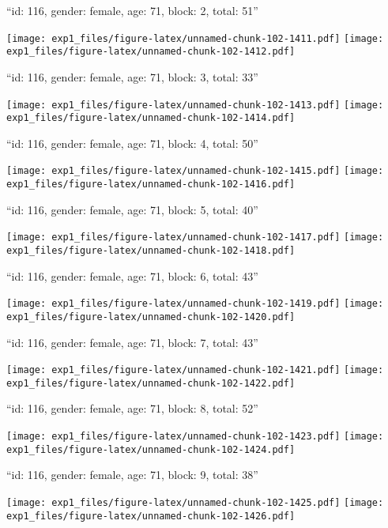 \documentclass[11pt,,]{article}
\begin{document}
\newpage
[1] 

``id: 116, gender: female, age: 71, block: 2, total: 51''

\texttt{[image: exp1\_files/figure-latex/unnamed-chunk-102-1411.pdf]}
\texttt{[image: exp1\_files/figure-latex/unnamed-chunk-102-1412.pdf]}

\newpage
[1] 

``id: 116, gender: female, age: 71, block: 3, total: 33''

\texttt{[image: exp1\_files/figure-latex/unnamed-chunk-102-1413.pdf]}
\texttt{[image: exp1\_files/figure-latex/unnamed-chunk-102-1414.pdf]}

\newpage
[1] 

``id: 116, gender: female, age: 71, block: 4, total: 50''

\texttt{[image: exp1\_files/figure-latex/unnamed-chunk-102-1415.pdf]}
\texttt{[image: exp1\_files/figure-latex/unnamed-chunk-102-1416.pdf]}

\newpage
[1] 

``id: 116, gender: female, age: 71, block: 5, total: 40''

\texttt{[image: exp1\_files/figure-latex/unnamed-chunk-102-1417.pdf]}
\texttt{[image: exp1\_files/figure-latex/unnamed-chunk-102-1418.pdf]}

\newpage
[1] 

``id: 116, gender: female, age: 71, block: 6, total: 43''

\texttt{[image: exp1\_files/figure-latex/unnamed-chunk-102-1419.pdf]}
\texttt{[image: exp1\_files/figure-latex/unnamed-chunk-102-1420.pdf]}

\newpage
[1] 

``id: 116, gender: female, age: 71, block: 7, total: 43''

\texttt{[image: exp1\_files/figure-latex/unnamed-chunk-102-1421.pdf]}
\texttt{[image: exp1\_files/figure-latex/unnamed-chunk-102-1422.pdf]}

\newpage
[1] 

``id: 116, gender: female, age: 71, block: 8, total: 52''

\texttt{[image: exp1\_files/figure-latex/unnamed-chunk-102-1423.pdf]}
\texttt{[image: exp1\_files/figure-latex/unnamed-chunk-102-1424.pdf]}

\newpage
[1] 

``id: 116, gender: female, age: 71, block: 9, total: 38''

\texttt{[image: exp1\_files/figure-latex/unnamed-chunk-102-1425.pdf]}
\texttt{[image: exp1\_files/figure-latex/unnamed-chunk-102-1426.pdf]}
\end{document}
